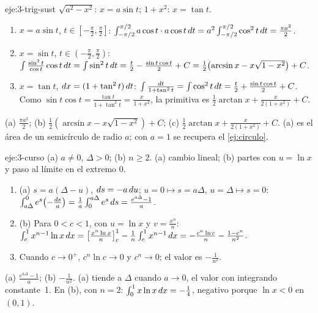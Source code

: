\begin{solucion}{eje:3-trig-sust}
\planteamiento $\sqrt{a^{2}-x^{2}}$: $x=a\sin t$; $1+x^{2}$: $x=\tan t$.
\pasos
\begin{enumerate}[label=(\alph*)]
  \item $x=a\sin t$, $t\in[-\frac\pi2,\frac\pi2]$: $\int_{-\pi/2}^{\pi/2}a\cos t\cdot a\cos t\mathop{}\!d t=a^{2}\int_{-\pi/2}^{\pi/2}\cos^{2}t\mathop{}\!d t=\frac{\pi a^{2}}{2}$.
  \item $x=\sin t$, $t\in(-\frac\pi2,\frac\pi2)$: $\int\frac{\sin^{2}t}{\cos t}\cos t\mathop{}\!d t=\int\sin^{2}t\mathop{}\!d t=\frac t2-\frac{\sin t\cos t}{2}+C=\frac12\bigl(\arcsin x-x\sqrt{1-x^{2}}\bigr)+C$.
  \item $x=\tan t$, $\mathop{}\!d x=(1+\tan^{2}t)\mathop{}\!d t$: $\int\frac{\mathop{}\!d t}{1+\tan^{2}t}=\int\cos^{2}t\mathop{}\!d t=\frac t2+\frac{\sin t\cos t}{2}+C$. Como $\sin t\cos t=\frac{\tan t}{1+\tan^{2}t}=\frac{x}{1+x^{2}}$, la primitiva es $\frac12\arctan x+\frac{x}{2(1+x^{2})}+C$.
\end{enumerate}
\resultado (a) $\frac{\pi a^{2}}{2}$; (b) $\frac12(\arcsin x-x\sqrt{1-x^{2}})+C$; (c) $\frac12\arctan x+\frac{x}{2(1+x^{2})}+C$.
\comprobacion (a) es el área de un semicírculo de radio $a$; con $a=1$ se recupera el \cref{ej:circulo}.
\end{solucion}

\begin{solucion}{eje:3-curso}
\datos (a) $a\neq0$, $\Delta>0$; (b) $n\ge2$.
\planteamiento (a) cambio lineal; (b) partes con $u=\ln x$ y paso al límite en el extremo $0$.
\pasos
\begin{enumerate}[label=\arabic*.]
  \item (a) $s=a(\Delta-u)$, $\mathop{}\!d s=-a\mathop{}\!d u$; $u=0\mapsto s=a\Delta$, $u=\Delta\mapsto s=0$: $\int_{a\Delta}^{0}e^{s}\bigl(-\frac{\mathop{}\!d s}{a}\bigr)=\frac1a\int_0^{a\Delta}e^{s}\mathop{}\!d s=\frac{e^{a\Delta}-1}{a}$.
  \item (b) Para $0<c<1$, con $u=\ln x$ y $v=\frac{x^{n}}{n}$: $\int_c^{1}x^{n-1}\ln x\mathop{}\!d x=\bigl[\frac{x^{n}\ln x}{n}\bigr]_{c}^{1}-\frac1n\int_c^{1}x^{n-1}\mathop{}\!d x=-\frac{c^{n}\ln c}{n}-\frac{1-c^{n}}{n^{2}}$.
  \item Cuando $c\to0^{+}$, $c^{n}\ln c\to0$ y $c^{n}\to0$; el valor es $-\frac{1}{n^{2}}$.
\end{enumerate}
\resultado (a) $\frac{e^{a\Delta}-1}{a}$; (b) $-\frac{1}{n^{2}}$.
\comprobacion (a) tiende a $\Delta$ cuando $a\to0$, el valor con integrando constante~1. En (b), con $n=2$: $\int_0^{1}x\ln x\mathop{}\!d x=-\frac14$, negativo porque $\ln x<0$ en $(0,1)$.
\end{solucion}

